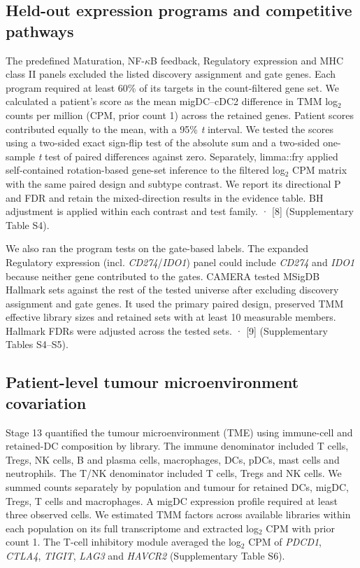 \documentclass[11pt,a4paper]{article}
\begin{document}
\subsection{Held-out expression programs and competitive pathways}
The predefined Maturation, NF-$\kappa$B feedback, Regulatory expression and MHC class II panels excluded the listed discovery assignment and gate genes. Each program required at least 60\% of its targets in the count-filtered gene set. We calculated a patient's score as the mean migDC--cDC2 difference in TMM log$_{2}$ counts per million (CPM, prior count 1) across the retained genes. Patient scores contributed equally to the mean, with a 95\% \textit{t} interval. We tested the scores using a two-sided exact sign-flip test of the absolute sum and a two-sided one-sample \textit{t} test of paired differences against zero. Separately, limma::fry applied self-contained rotation-based gene-set inference to the filtered log$_{2}$ CPM matrix with the same paired design and subtype contrast. We report its directional P and FDR and retain the mixed-direction results in the evidence table. BH adjustment is applied within each contrast and test family. · [8] (Supplementary Table S4).

We also ran the program tests on the gate-based labels. The expanded Regulatory expression (incl. \textit{CD274}/\textit{IDO1}) panel could include \textit{CD274} and \textit{IDO1} because neither gene contributed to the gates. CAMERA tested MSigDB Hallmark sets against the rest of the tested universe after excluding discovery assignment and gate genes. It used the primary paired design, preserved TMM effective library sizes and retained sets with at least 10 measurable members. Hallmark FDRs were adjusted across the tested sets. · [9] (Supplementary Tables S4--S5).

\subsection{Patient-level tumour microenvironment covariation}
Stage 13 quantified the tumour microenvironment (TME) using immune-cell and retained-DC composition by library. The immune denominator included T cells, Tregs, NK cells, B and plasma cells, macrophages, DCs, pDCs, mast cells and neutrophils. The T/NK denominator included T cells, Tregs and NK cells. We summed counts separately by population and tumour for retained DCs, migDC, Tregs, T cells and macrophages. A migDC expression profile required at least three observed cells. We estimated TMM factors across available libraries within each population on its full transcriptome and extracted log$_{2}$ CPM with prior count 1. The T-cell inhibitory module averaged the log$_{2}$ CPM of \textit{PDCD1}, \textit{CTLA4}, \textit{TIGIT}, \textit{LAG3} and \textit{HAVCR2} (Supplementary Table S6).
\end{document}

